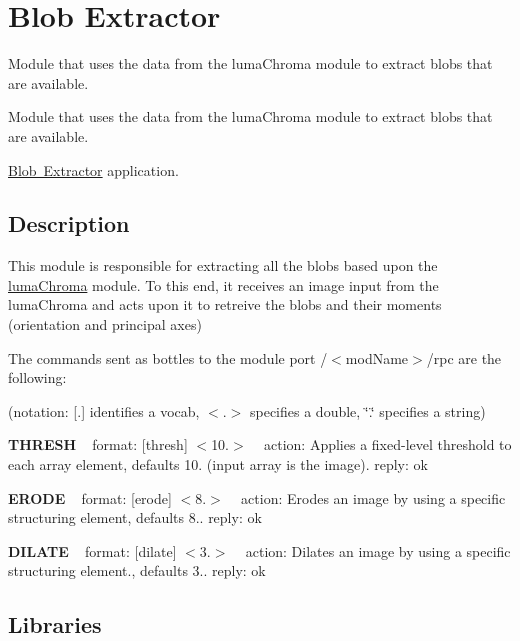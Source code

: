 \section{Blob Extractor}
\label{group__blobExtractor}


Module that uses the data from the luma\+Chroma module to extract blobs that are available.  


Module that uses the data from the luma\+Chroma module to extract blobs that are available. 

\mbox{\hyperlink{group__blobExtractor}{Blob Extractor}} application.\hypertarget{group__seg2cloud_intro_sec}{}\subsection{Description}\label{group__seg2cloud_intro_sec}
This module is responsible for extracting all the blobs based upon the \mbox{\hyperlink{group__lumaChroma}{luma\+Chroma}} module. To this end, it receives an image input from the luma\+Chroma and acts upon it to retreive the blobs and their moments (orientation and principal axes)

The commands sent as bottles to the module port /$<$mod\+Name$>$/rpc are the following\+:

(notation\+: \mbox{[}.\mbox{]} identifies a vocab, $<$.$>$ specifies a double, \char`\"{}.\char`\"{} specifies a string)

{\bfseries{T\+H\+R\+E\+SH}} ~\newline
 format\+: \mbox{[}thresh\mbox{]} $<$10.$>$ ~\newline
 action\+: Applies a fixed-\/level threshold to each array element, defaults 10. (input array is the image). reply\+: ok

{\bfseries{E\+R\+O\+DE}} ~\newline
 format\+: \mbox{[}erode\mbox{]} $<$8.$>$ ~\newline
 action\+: Erodes an image by using a specific structuring element, defaults 8.. reply\+: ok

{\bfseries{D\+I\+L\+A\+TE}} ~\newline
 format\+: \mbox{[}dilate\mbox{]} $<$3.$>$ ~\newline
 action\+: Dilates an image by using a specific structuring element., defaults 3.. reply\+: ok\hypertarget{group__blobExtractor_lib_sec}{}\subsection{Libraries}\label{group__blobExtractor_lib_sec}

